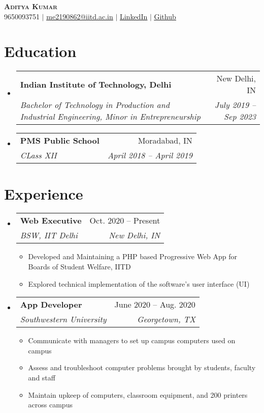 \documentclass[letterpaper,11pt]{article}
\makeatletter
\newcommand{\resumeItem}[1]{
  \item\small{
    {#1 \vspace{-2pt}}
  }
}
\newcommand{\resumeSubheading}[4]{
  \vspace{-2pt}\item
    \begin{tabular*}{0.97\textwidth}[t]{l@{\extracolsep{\fill}}r}
      \textbf{#1} & #2 \\
      \textit{\small#3} & \textit{\small #4} \\
    \end{tabular*}\vspace{-7pt}
}
\newcommand{\resumeSubHeadingListStart}{\begin{itemize}[leftmargin=0.15in, label={}]}
\newcommand{\resumeSubHeadingListEnd}{\end{itemize}}
\newcommand{\resumeItemListStart}{\begin{itemize}}
\newcommand{\resumeItemListEnd}{\end{itemize}\vspace{-5pt}}
\makeatother
\begin{document}
\begin{center}
    \textbf{\Huge \scshape Aditya Kumar} \\ \vspace{5pt}
    \small 9650093751 $|$ \href{mailto:me2190862@iitd.ac.in}{\underline{me2190862@iitd.ac.in}} $|$ 
    \href{https://linkedin.com/in/aditya-kumar-inductor}{\underline{LinkedIn}} $|$
    \href{https://github.com/inductor69}{\underline{Github}}
\end{center}


\section{Education}
  \resumeSubHeadingListStart
    \resumeSubheading
      {Indian Institute of Technology, Delhi}{New Delhi, IN}
      {Bachelor of Technology in Production and Industrial Engineering, Minor in Entrepreneurship}{July 2019 -- Sep 2023}
    \resumeSubheading
      {PMS Public School}{Moradabad, IN}
      {CLass XII}{April 2018 -- April 2019}
  \resumeSubHeadingListEnd


\section{Experience}
  \resumeSubHeadingListStart

    \resumeSubheading
      {Web Executive}{Oct. 2020 -- Present}
      {BSW, IIT Delhi}{New Delhi, IN}
      \resumeItemListStart
        \resumeItem{Developed and Maintaining a PHP based Progressive Web App for Boards of Student Welfare, IITD}
        \resumeItem{Explored technical implementation of the software's user interface (UI)}
      \resumeItemListEnd

    \resumeSubheading
      {App Developer}{June 2020 -- Aug. 2020}
      {Southwestern University}{Georgetown, TX}
      \resumeItemListStart
        \resumeItem{Communicate with managers to set up campus computers used on campus}
        \resumeItem{Assess and troubleshoot computer problems brought by students, faculty and staff}
        \resumeItem{Maintain upkeep of computers, classroom equipment, and 200 printers across campus}
    \resumeItemListEnd

  \resumeSubHeadingListEnd


\end{document}
